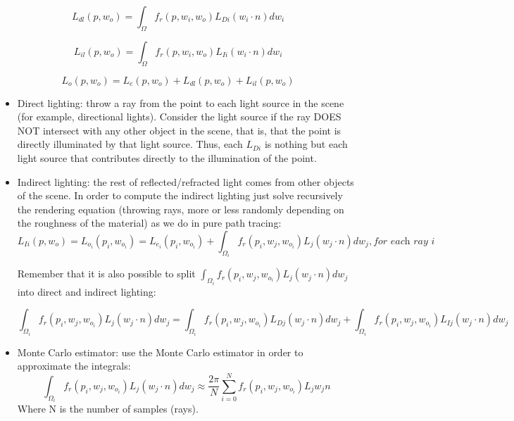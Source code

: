 \documentclass{article}
\begin{document}
$$L_{dl} \left (  p, w_{o} \right ) = \int_{\Omega} f_{r}\left (  p, w_{i}, w_{o} \right ) L_{Di} (w_{i} \cdot n) dw_{i}$$

$$L_{il} \left( p, w_{o} \right) = \int_{\Omega} f_{r}\left (  p, w_{i}, w_{o} \right ) L_{Ii} (w_{i} \cdot n) dw_{i}$$

$$L_{o} \left (  p, w_{o} \right ) = L_{e} \left (  p, w_{o} \right ) + L_{dl}\left( p, w_{o} \right) + L_{il}\left( p, w_{o} \right)$$

\begin{itemize}
  \item Direct lighting: throw a ray from the point to each light source in the scene (for example, directional lights). Consider the light source if the ray DOES NOT intersect with any other object in the scene, that is, that the point is directly illuminated by that light source.
  Thus, each $L_{Di}$ is nothing but each light source that contributes directly to the illumination of the point.

  \item Indirect lighting: the rest of reflected/refracted light comes from other objects of the scene. In order to compute the indirect lighting just solve recursively the rendering equation (throwing rays, more or less randomly depending on the roughness of the material) as we do in pure path tracing:
  $$L_{Ii} \left (  p, w_{o} \right ) = L_{o_i} \left (  p_i, w_{o_i} \right ) = L_{e_{i}} \left (  p_i, w_{o_i} \right ) + \int_{\Omega_i} f_{r}\left (  p_i, w_{j}, w_{o_i} \right ) L_{j} (w_{j} \cdot n) dw_{j}, \textit{for each ray i}$$
  
  Remember that it is also possible to split $\int_{\Omega_i} f_{r}\left (  p_i, w_{j}, w_{o_i} \right ) L_{j} (w_{j} \cdot n) dw_{j}$ into direct and indirect lighting:
  
  $$\int_{\Omega_i} f_{r}\left (  p_i, w_{j}, w_{o_i} \right ) L_{j} (w_{j} \cdot n) dw_{j} = \int_{\Omega_i} f_{r}\left (  p_i, w_{j}, w_{o_i} \right ) L_{Dj} (w_{j} \cdot n) dw_{j} + \int_{\Omega_i} f_{r}\left (  p_i, w_{j}, w_{o_i} \right ) L_{Ij} (w_{j} \cdot n) dw_{j}$$

  \item Monte Carlo estimator: use the Monte Carlo estimator in order to approximate the integrals:
  $$\int_{\Omega_i} f_{r}\left (  p_i, w_{j}, w_{o_i} \right ) L_{j} (w_{j} \cdot n) dw_{j} \approx \frac{2\pi}{N}\sum_{i=0}^{N}f_{r}\left (  p_i, w_{j}, w_{o_i} \right ) L_{j} w_{j} n$$
  Where N is the number of samples (rays).
\end{itemize}
\end{document}
